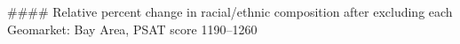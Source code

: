 #### Relative percent change in racial/ethnic composition after excluding each Geomarket: Bay Area, PSAT score 1190–1260
